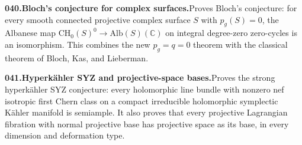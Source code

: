 \documentclass[11pt,a4paper]{article}
\begin{document}
  \par \begin{minipage}{\linewidth}
  \fontsize{10.5}{12.6}\selectfont\RaggedRight
  \hypertarget{result 040}{}
  {\bfseries\textcolor{muted}{040.}\enspace Bloch's conjecture for complex surfaces.}\enspace Proves Bloch's conjecture: for every smooth connected projective complex surface $S$ with $p_g(S)=0$, the Albanese map $\mathrm{CH}_0(S)^0\to\mathrm{Alb}(S)(\mathbb C)$ on integral degree-zero zero-cycles is an isomorphism. This combines the new $p_g=q=0$ theorem with the classical theorem of Bloch, Kas, and Lieberman.\par
  \end{minipage}\par\vspace{5pt}



  \par \begin{minipage}{\linewidth}
  \fontsize{10.5}{12.6}\selectfont\RaggedRight
  \hypertarget{result 041}{}
  {\bfseries\textcolor{muted}{041.}\enspace Hyperk\"ahler SYZ and projective-space bases.}\enspace Proves the strong hyperk\"ahler SYZ conjecture: every holomorphic line bundle with nonzero nef isotropic first Chern class on a compact irreducible holomorphic symplectic K\"ahler manifold is semiample. It also proves that every projective Lagrangian fibration with normal projective base has projective space as its base, in every dimension and deformation type.\par
  \end{minipage}\par\vspace{5pt}
\end{document}
